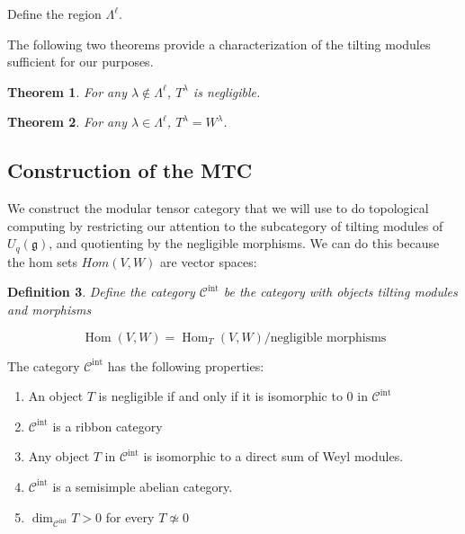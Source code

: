 \documentclass[]{article}
\newtheorem{theorem}{Theorem}[subsection]
\newtheorem{defn}[theorem]{Definition}
\newcommand{\Hom}{\operatorname{Hom}}
\numberwithin{equation}{subsection}
\begin{document}
Define the region $\Lambda^\ell$.

The following two theorems provide a characterization of the tilting modules sufficient for our purposes.

\begin{theorem}
For any $\lambda \notin \Lambda^\ell$, $T^\lambda$ is negligible. 
\end{theorem}

\begin{theorem}
For any $\lambda \in \Lambda^\ell$, $T^\lambda = W^\lambda$.
\end{theorem}



\subsection{Construction of the MTC}

We construct the modular tensor category that we will use to do topological
computing by restricting our attention to the subcategory of tilting modules of
$U_q(\mathfrak{g})$, and quotienting by the negligible morphisms. We can do
this because the hom sets $Hom(V,W)$ are vector spaces:

\begin{defn}
    Define the category $\mathcal{C}^\text{int}$ be the category with objects tilting modules and morphisms 

    \begin{equation*}
        \Hom(V,W) = \Hom_T(V,W) / \text{negligible morphisms}
    \end{equation*}

\end{defn}

The category $\mathcal{C}^\text{int}$ has the following properties:
\begin{enumerate}
    \item An object $T$ is negligible if and only if it is isomorphic to 0 in $\mathcal{C}^\text{int}$
    \item  $\mathcal{C}^\text{int}$ is a ribbon category
    \item Any object $T$ in $\mathcal{C}^\text{int}$ is isomorphic to a direct sum of Weyl modules.
    \item $\mathcal{C}^\text{int}$ is a semisimple abelian category. 
    \item $\dim_{\mathcal{C}^\text{int}} T > 0$ for every $T \not\simeq 0$
\end{enumerate}
\end{document}
